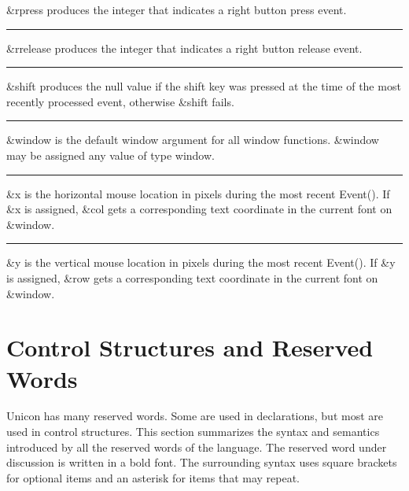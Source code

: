 \noindent
\textsf{\&rpress} produces the integer that indicates a right button
press event.

\bigskip\hrule\vspace{0.1cm}

\noindent
\textsf{\&rrelease} produces the integer that indicates a right button
release event.

\bigskip\hrule\vspace{0.1cm}

\noindent
\textsf{\&shift} produces the null value if the shift key was pressed at
the time of the most recently processed event, otherwise
\textsf{\&shift} fails.

\bigskip\hrule\vspace{0.1cm}

\noindent
\textsf{\&window} is the default window argument for all window
functions. \textsf{\&window} may be assigned any value of type
window.

\bigskip\hrule\vspace{0.1cm}

\noindent
\textsf{\&x} is the horizontal mouse location in pixels during the most
recent \textsf{Event()}. If \textsf{\&x} is assigned, \textsf{\&col}
gets a corresponding text coordinate in the current font on
\textsf{\&window}.

\bigskip\hrule\vspace{0.1cm}

\noindent
\textsf{\&y} is the vertical mouse location in pixels during the most
recent \textsf{Event()}. If \textsf{\&y} is assigned, \textsf{\&row}
gets a corresponding text coordinate in the current font on
\textsf{\&window}.

\section{Control Structures and Reserved Words}

Unicon has many reserved words. Some are used in
declarations, but most are used in control
structures. This section summarizes the syntax and semantics
introduced by all the reserved words of the language. The reserved
word under discussion is written in a bold font. The surrounding
syntax uses square brackets for optional items and an asterisk for
items that may repeat.

